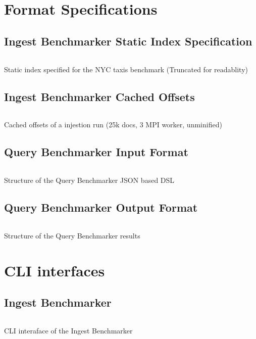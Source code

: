 \section{Format Specifications}
\subsection{Ingest Benchmarker Static Index Specification}
\begin{listing}[H]
  \inputminted{json}{./assets/nyc_def.json}
\caption{Static index specified for the NYC taxis benchmark (Truncated for readablity)}
\end{listing}

\subsection{Ingest Benchmarker Cached Offsets}
\begin{listing}[H]
  \inputminted{json}{./assets/offsets.json}
\caption{Cached offsets of a injestion run (25k docs, 3 MPI worker, unminified)}
\end{listing}

\subsection{Query Benchmarker Input Format}
\begin{listing}[H]
  \inputminted{C}{./assets/query_input_example.json}
\caption{Structure of the Query Benchmarker JSON based \acs{DSL}}
\end{listing}

\subsection{Query Benchmarker Output Format}
\begin{listing}[H]
  \inputminted{C}{./assets/query_output_example.json}
\caption{Structure of the Query Benchmarker results}
\end{listing}

\section{CLI interfaces}
\subsection{Ingest Benchmarker}
\begin{listing}[H]
  \inputminted{text}{./assets/ingest.txt}
\caption{CLI interaface of the Ingest Benchmarker}
\end{listing}


